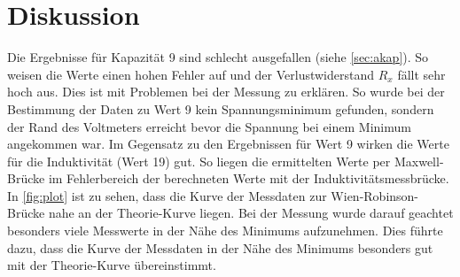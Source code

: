 \section{Diskussion}
\label{sec:Diskussion}

Die Ergebnisse für Kapazität 9 sind schlecht ausgefallen (siehe \autoref{sec:akap}). So weisen die Werte einen hohen Fehler auf und der Verlustwiderstand $R_x$ fällt sehr hoch aus. Dies ist mit Problemen bei der Messung zu erklären. So wurde bei der Bestimmung der Daten zu Wert 9 kein Spannungsminimum gefunden, sondern der Rand des Voltmeters erreicht bevor die Spannung bei einem Minimum angekommen war.\newline
Im Gegensatz zu den Ergebnissen für Wert 9 wirken die Werte für die Induktivität (Wert 19) gut. So liegen die ermittelten Werte per Maxwell-Brücke im Fehlerbereich der berechneten Werte mit der Induktivitätsmessbrücke.\newline
In \autoref{fig:plot} ist zu sehen, dass die Kurve der Messdaten zur Wien-Robinson-Brücke nahe an der Theorie-Kurve liegen. Bei der Messung wurde darauf geachtet besonders viele Messwerte in der Nähe des Minimums aufzunehmen. Dies führte dazu, dass die Kurve der Messdaten in der Nähe des Minimums besonders gut mit der Theorie-Kurve übereinstimmt. 